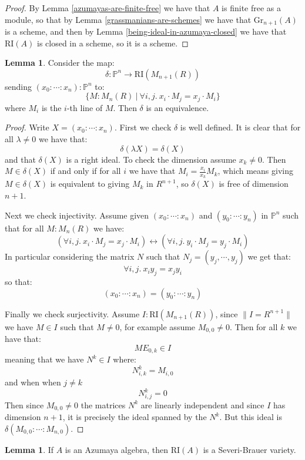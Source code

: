 \documentclass[10pt,a4paper]{article}
\theoremstyle{definition}
\newtheorem{lemma}[theorem]{Lemma}
\newcommand{\Gr}{\mathrm{Gr}}
\newcommand{\RI}{\mathrm{RI}}
\newcommand{\propTrunc}[1]{\lVert #1 \rVert}
\newcommand{\bP}{\mathbb{P}}
\begin{document}
\begin{proof}
By Lemma \ref{azumayas-are-finite-free} we have that $A$ is finite free as a module, so that by Lemma \ref{grassmanians-are-schemes} we have that $\Gr_{n+1}(A)$ is a scheme, and then by Lemma \ref{being-ideal-in-azumaya-closed} we have that $\RI(A)$ is closed in a scheme, so it is a scheme.
\end{proof}

\begin{lemma}\label{right-ideal-of-matrices-are-projective}
Consider the map:
\[\delta:\bP^n \to \RI(M_{n+1}(R))\]
sending $(x_0:\cdots:x_n):\bP^n$ to:
\[\{M:M_n(R)\ |\ \forall i,j.\ x_i\cdot M_j = x_j\cdot M_i\}\]
where $M_i$ is the $i$-th line of $M$. Then $\delta$ is an equivalence.
\end{lemma}

\begin{proof}
Write $X=(x_0:\cdots:x_n)$. First we check $\delta$ is well defined. It is clear that for all $\lambda\not=0$ we have that:
\[\delta(\lambda X) = \delta(X)\]
and that $\delta(X)$ is a right ideal. To check the dimension assume $x_k\not=0$. Then $M\in\delta(X)$ if and only if for all $i$ we have that $M_i = \frac{x_i}{x_k} M_k$, which means giving $M\in\delta(X)$ is equivalent to giving $M_k$ in $R^{n+1}$, so $\delta(X)$ is free of dimension $n+1$.

Next we check injectivity. Assume given $(x_0:\cdots:x_n)$ and $(y_0:\cdots:y_n)$ in $\bP^n$ such that for all $M:M_n(R)$ we have:
\[(\forall i,j.\ x_i\cdot M_j = x_j\cdot M_i) \leftrightarrow (\forall i,j.\ y_i\cdot M_j = y_j\cdot M_i)\]
In particular considering the matrix $N$ such that $N_j = (y_j,\cdots,y_j)$ we get that:
\[\forall i,j.\ x_iy_j=x_jy_i\] 
so that:
\[(x_0:\cdots:x_n) = (y_0:\cdots:y_n)\]

Finally we check surjectivity. Assume $I:\RI(M_{n+1}(R))$, since $\propTrunc{I=R^{n+1}}$ we have $M\in I$ such that $M\not=0$, for example assume $M_{0,0}\not=0$. Then for all $k$ we have that:
\[ME_{0,k}\in I\]
meaning that we have $N^k\in I$ where:
\[N^k_{i,k} = M_{i,0}\]
and when when $j\not=k$
\[N^k_{i,j} = 0\]
Then since $M_{0,0}\not=0$ the matrices $N^k$ are linearly independent and since $I$ has dimension $n+1$, it is precisely the ideal spanned by the $N^k$. But this ideal is $\delta(M_{0,0}:\cdots:M_{n,0})$.
\end{proof}

\begin{lemma}
If $A$ is an Azumaya algebra, then $\RI(A)$ is a Severi-Brauer variety.
\end{lemma}
\end{document}
